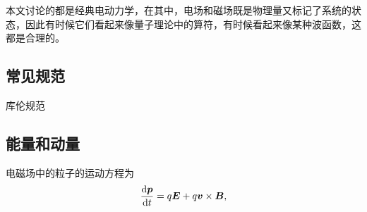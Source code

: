 \documentclass[UTF8, a4paper]{ctexart}
\begin{document}
本文讨论的都是经典电动力学，在其中，电场和磁场既是物理量又标记了系统的状态，因此有时候它们看起来像量子理论中的算符，有时候看起来像某种波函数，这都是合理的。

\subsection{常见规范}

库伦规范

\subsection{能量和动量}

电磁场中的粒子的运动方程为
\begin{equation}
    \dv{\vb*{p}}{t} = q \vb*{E} + q \vb*{v} \times \vb*{B},
\end{equation}
\end{document}
